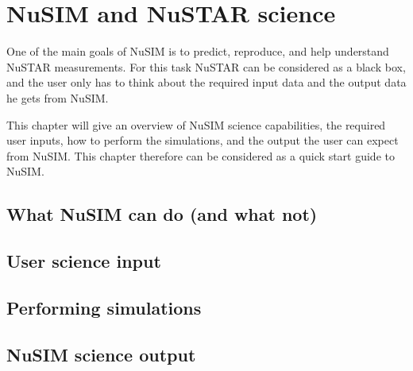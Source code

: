 \chapter{NuSIM and NuSTAR science}

One of the main goals of NuSIM is to predict, reproduce, and help understand NuSTAR measurements.
For this task NuSTAR can be considered as a black box, and the user only has to think about the required input data and the output data he gets from NuSIM. 

This chapter will give an overview of NuSIM science capabilities, the required user inputs, how to perform the simulations, and the output the user can expect from NuSIM. This chapter therefore can be considered as a quick start guide to NuSIM.

\section{What NuSIM can do (and what not)}

\section{User science input}

\section{Performing simulations}

\section{NuSIM science output}
